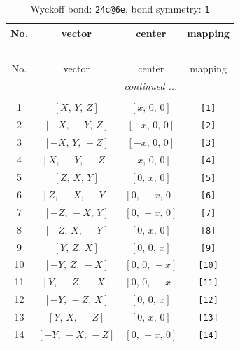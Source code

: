 \documentclass[fleqn,8pt]{jsarticle}
\begin{document}
\begin{longtable}{cccc}
\caption{Wyckoff bond: {\tt 24c@6e}, bond symmetry: {\tt 1}}
 \\
 \hline \hline
No. & vector & center & mapping \\ \hline \endfirsthead

\multicolumn{3}{l}{\tablename\ \thetable{}} \\
 \hline \hline
No. & vector & center & mapping \\ \hline \endhead

 \hline \hline
\multicolumn{3}{r}{\footnotesize\it continued ...} \\ \endfoot

 \hline \hline
\multicolumn{3}{r}{} \\ \endlastfoot

1 & $\left[ X,\, Y,\, Z \right]$ & $\left[ x,\, 0,\, 0 \right]$ & {\tt [1]} \\ \hline
2 & $\left[ - X,\, - Y,\, Z \right]$ & $\left[ - x,\, 0,\, 0 \right]$ & {\tt [2]} \\ \hline
3 & $\left[ - X,\, Y,\, - Z \right]$ & $\left[ - x,\, 0,\, 0 \right]$ & {\tt [3]} \\ \hline
4 & $\left[ X,\, - Y,\, - Z \right]$ & $\left[ x,\, 0,\, 0 \right]$ & {\tt [4]} \\ \hline
5 & $\left[ Z,\, X,\, Y \right]$ & $\left[ 0,\, x,\, 0 \right]$ & {\tt [5]} \\ \hline
6 & $\left[ Z,\, - X,\, - Y \right]$ & $\left[ 0,\, - x,\, 0 \right]$ & {\tt [6]} \\ \hline
7 & $\left[ - Z,\, - X,\, Y \right]$ & $\left[ 0,\, - x,\, 0 \right]$ & {\tt [7]} \\ \hline
8 & $\left[ - Z,\, X,\, - Y \right]$ & $\left[ 0,\, x,\, 0 \right]$ & {\tt [8]} \\ \hline
9 & $\left[ Y,\, Z,\, X \right]$ & $\left[ 0,\, 0,\, x \right]$ & {\tt [9]} \\ \hline
10 & $\left[ - Y,\, Z,\, - X \right]$ & $\left[ 0,\, 0,\, - x \right]$ & {\tt [10]} \\ \hline
11 & $\left[ Y,\, - Z,\, - X \right]$ & $\left[ 0,\, 0,\, - x \right]$ & {\tt [11]} \\ \hline
12 & $\left[ - Y,\, - Z,\, X \right]$ & $\left[ 0,\, 0,\, x \right]$ & {\tt [12]} \\ \hline
13 & $\left[ Y,\, X,\, - Z \right]$ & $\left[ 0,\, x,\, 0 \right]$ & {\tt [13]} \\ \hline
14 & $\left[ - Y,\, - X,\, - Z \right]$ & $\left[ 0,\, - x,\, 0 \right]$ & {\tt [14]} \\ \hline

\end{longtable}
\end{document}
